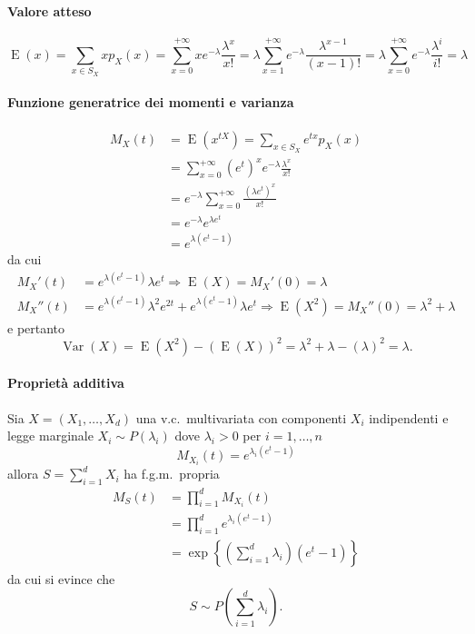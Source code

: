 \documentclass[11pt,a4paper,twoside]{article}
\newcommand\smallsum{\textstyle\sum}
\DeclareMathOperator{\Var}{Var}
\DeclareMathOperator{\E}{E}
\begin{document}
\paragraph{Valore atteso}
\[
  \E(x) = \sum_{x\in S_X} xp_X(x) = \sum_{x=0}^{+\infty} x
  e^{-\lambda} \frac{\lambda^x}{x!} = \lambda\sum_{x=1}^{+\infty}
  e^{-\lambda} \frac{\lambda^{x-1}}{(x-1)!} = \lambda
  \sum_{x=0}^{+\infty} e^{-\lambda} \frac{\lambda^i}{i!} = \lambda
\]

\paragraph{Funzione generatrice dei momenti e varianza}
\begin{align*}
  M_X(t)
  &= \E(x^{t X}) = \sum_{x\in S_X} e^{tx} p_X(x) \\
  &= \sum_{x=0}^{+\infty} \left( e^t \right)^x e^{-\lambda}\frac{\lambda^x}{x!} \\
  &= e^{-\lambda} \sum_{x=0}^{+\infty} \frac{\left( \lambda e^t\right)^x}{x!} \\
  &= e^{-\lambda} e^{\lambda e^t} \\
  &= e^{\lambda (e^t -1)}
\end{align*}
da cui
\begin{align*}
  M_X'(t) &= e^{\lambda (e^t -1)} \lambda e^t \Longrightarrow \E(X) =
            M_X'(0) = \lambda \\
  M_X''(t) &= e^{\lambda (e^t -1)} \lambda^2 e^{2t} + e^{\lambda (e^t
             -1)}\lambda e^t \Longrightarrow \E(X^2) = M_X''(0) =
             \lambda^2 + \lambda
\end{align*}
e pertanto
\[
  \Var(X) = \E(X^2) - (\E(X))^2 = \lambda^2 + \lambda - (\lambda)^2 = \lambda.
\]

\paragraph{Proprietà additiva}
Sia \(X = (X_1, \dots, X_d)\) una v.c.\ multivariata con componenti
\(X_i\) indipendenti e legge marginale \(X_i \sim P(\lambda_i)\) dove
\(\lambda_i > 0\) per \(i = 1, \dots, n\)
\[
  M_{X_i}(t) = e^{\lambda_i (e^t -1)}
\]
allora \(S = \sum_{i=1}^d X_i\) ha f.g.m.\ propria
\begin{align*}
  M_S(t)
  &= \prod_{i=1}^d M_{X_i}(t) \\
  &= \prod_{i=1}^d e^{\lambda_i (e^t -1)} \\
  &= \exp \left\{ \left( \sum_{i=1}^d \lambda_i \right) (e^t-1) \right\}
\end{align*}
da cui si evince che
\[
  S \sim P\left( \smallsum_{i=1}^d \lambda_i \right) .
\]
\end{document}
